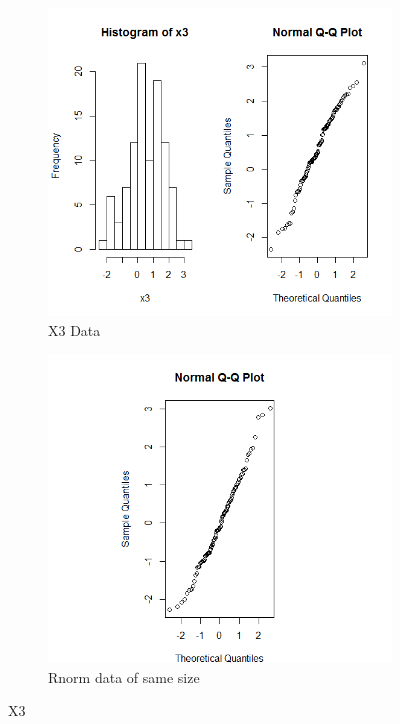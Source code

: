 \documentclass{article}
\begin{document}
    \begin{figure}
    \begin{subfigure}{.5\textwidth}
      \centering
      \includegraphics[width=.8\linewidth]{results/X3}
      \caption{X3 Data}
    \end{subfigure}
    \begin{subfigure}{.5\textwidth}
      \centering
      \includegraphics[width=.8\linewidth]{results/X3_2}
      \caption{Rnorm data of same size}
    \end{subfigure}
    \caption{X3}
    \label{fig:X3}
    \end{figure}
\end{document}

